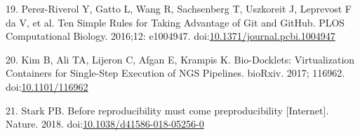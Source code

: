 \documentclass[10pt,letterpaper]{article}
\begin{document}
\leavevmode\hypertarget{ref-perez-riverol_ten_2016}{}%
19. Perez-Riverol Y, Gatto L, Wang R, Sachsenberg T, Uszkoreit J,
Leprevost F da V, et al. Ten Simple Rules for Taking Advantage of Git
and GitHub. PLOS Computational Biology. 2016;12: e1004947.
doi:\href{https://doi.org/10.1371/journal.pcbi.1004947}{10.1371/journal.pcbi.1004947}

\leavevmode\hypertarget{ref-kim_bio-docklets_2017}{}%
20. Kim B, Ali TA, Lijeron C, Afgan E, Krampis K. Bio-Docklets:
Virtualization Containers for Single-Step Execution of NGS Pipelines.
bioRxiv. 2017; 116962.
doi:\href{https://doi.org/10.1101/116962}{10.1101/116962}

\leavevmode\hypertarget{ref-stark_before_2018}{}%
21. Stark PB. Before reproducibility must come preproducibility
{[}Internet{]}. Nature. 2018.
doi:\href{https://doi.org/10.1038/d41586-018-05256-0}{10.1038/d41586-018-05256-0}

\nolinenumbers
\end{document}
